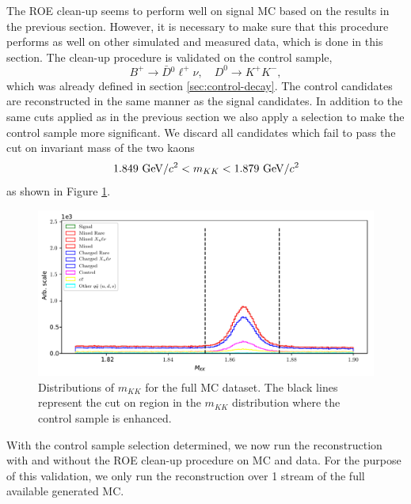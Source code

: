 The ROE clean-up seems to perform well on signal MC based on the results in the previous section. However, it is necessary to make sure that this procedure performs as well on other simulated and measured data, which is done in this section. The clean-up procedure is validated on the control sample, $$B^+ \to \bar D {}^0 \ell^+ \nu,\quad D^0 \to K^+K^-,$$
which was already defined in section \ref{sec:control-decay}. The control candidates are reconstructed in the same manner as the signal candidates. In addition to the same cuts applied as in the previous section we also apply a selection to make the control sample more significant. We discard all candidates which fail to pass the cut on invariant mass of the two kaons
\begin{equation}
1.849\mathrm{~GeV}/c^2 < m_{KK} < 1.879\mathrm{~GeV}/c^2
\end{equation}
as shown in Figure \ref{fig:roe_mKK}.
\begin{figure}[H]
	\centering
	\captionsetup{width=0.8\linewidth}
	\includegraphics[width=\linewidth]{fig/roe_mKK_cut}
	\caption{Distributions of $m_{KK}$ for the full MC dataset. The black lines represent the cut on region in the $m_{KK}$ distribution where the control sample is enhanced.}
	\label{fig:roe_mKK}
\end{figure}

With the control sample selection determined, we now run the reconstruction with and without the ROE clean-up procedure on MC and data. For the purpose of this validation, we only run the reconstruction over 1 stream of the full available generated MC. 

